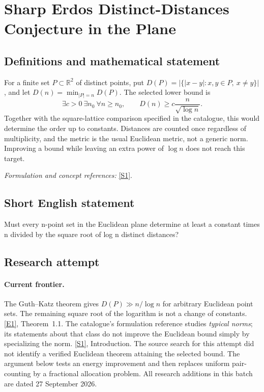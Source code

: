 \documentclass[11pt,a4paper]{article}
\newcommand{\R}{\mathbb{R}}
\newcommand{\sref}[2]{\hyperlink{source:#1:#2}{[S#2]}}
\newcommand{\eref}[2]{\hyperlink{extra:#1:#2}{[E#2]}}
\newif\ifshowcatalogue
\newcommand{\cataloguescope}[1]{\ifshowcatalogue
 \paragraph{Exact scope in the supplied catalogue.}
 \begin{quote}\small #1\end{quote}\fi}
\numberwithin{equation}{section}
\begin{document}
\setcounter{section}{0}
\clearpage
\section*{\texorpdfstring{Sharp Erdos Distinct-Distances Conjecture in the Plane}{Sharp Erdos Distinct-Distances Conjecture in the Plane}}\label{statement}
\subsection{Definitions and mathematical statement}
For a finite set $P\subset\R^2$ of distinct points, put
$D(P)=|\{|x-y|:x,y\in P,\ x\ne y\}|$, and let
$D(n)=\min_{|P|=n}D(P)$. The selected lower bound is
\[
 \exists c>0\ \exists n_0\ \forall n\ge n_0,
 \qquad D(n)\ge c\frac{n}{\sqrt{\log n}}.
\]
Together with the square-lattice comparison specified in the catalogue, this would determine the order up to constants. Distances are counted once regardless of multiplicity, and the metric is the usual Euclidean metric, not a generic norm. Improving a bound while leaving an extra power of $\log n$ does not reach this target.
\par\smallskip\textit{Formulation and concept references:} \sref{statement}{1}.
\cataloguescope{Let D(n) be the minimum, over all sets of n distinct points in the Euclidean plane, of the number of distinct pairwise distances determined by the set. Prove D(n) = Omega(n/sqrt(log n)), matching up to a constant factor the square-lattice construction D(n) = O(n/sqrt(log n)).}
\subsection{Short English statement}
Must every n-point set in the Euclidean plane determine at least a constant times n divided by the square root of log n distinct distances?
\subsection{Research attempt}

\paragraph{Current frontier.}
The Guth--Katz theorem gives $D(P)\gg n/\log n$ for arbitrary Euclidean
point sets. The remaining square root of the logarithm is not a change
of constants. \eref{statement}{1}, Theorem~1.1.
The catalogue's formulation reference studies \emph{typical norms}; its
statements about that class do not improve the Euclidean bound simply by
specializing the norm. \sref{statement}{1}, Introduction. The source search for
this attempt did not identify a verified Euclidean theorem attaining the
selected bound. The argument below tests an energy improvement and then
replaces uniform pair-counting by a fractional allocation problem.
All research additions in this batch are dated 27 September 2026.
\end{document}
